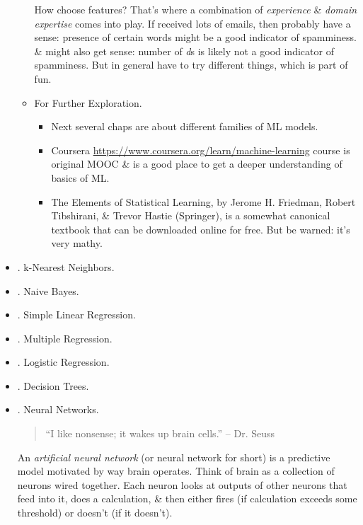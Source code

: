 \documentclass{article}
\begin{document}
\begin{itemize}
\begin{itemize}
		How choose features? That's where a combination of {\it experience} \& {\it domain expertise} comes into play. If received lots of emails, then probably have a sense: presence of certain words might be a good indicator of spamminess. \& might also get sense: number of {\it d}s is likely not a good indicator of spamminess. But in general have to try different things, which is part of fun.
		\item {\sf For Further Exploration.}
		\begin{itemize}
			\item Next several chaps are about different families of ML models.
			\item Coursera \url{https://www.coursera.org/learn/machine-learning} course is original MOOC \& is a good place to get a deeper understanding of basics of ML.
			\item The Elements of Statistical Learning, by Jerome H. Friedman, Robert Tibshirani, \& Trevor Hastie (Springer), is a somewhat canonical textbook that can be downloaded online for free. But be warned: it's very mathy.
		\end{itemize}
	\end{itemize}
	\item {. k-Nearest Neighbors.}
	\item {. Naive Bayes.}
	\item {. Simple Linear Regression.}
	\item {. Multiple Regression.}
	\item {. Logistic Regression.}
	\item {. Decision Trees.}
	\item {. Neural Networks.}
	\begin{quote}
		``I like nonsense; it wakes up brain cells.'' -- Dr. {\sc Seuss}
	\end{quote}
	An {\it artificial neural network} (or neural network for short) is a predictive model motivated by way brain operates. Think of brain as a collection of neurons wired together. Each neuron looks at outputs of other neurons that feed into it, does a calculation, \& then either fires (if calculation exceeds some threshold) or doesn't (if it doesn't).
	

\end{itemize}
\end{document}
